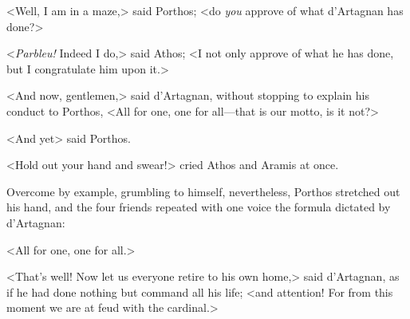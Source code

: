 <Well, I am in a maze,> said Porthos; <do \textit{you} approve of what d'Artagnan has done?> 

<\textit{Parbleu!} Indeed I do,> said Athos; <I not only approve of what he has done, but I congratulate him upon it.> 

<And now, gentlemen,> said d'Artagnan, without stopping to explain his conduct to Porthos, <All for one, one for all---that is our motto, is it not?> 

<And yet\longdash> said Porthos. 

<Hold out your hand and swear!> cried Athos and Aramis at once. 

Overcome by example, grumbling to himself, nevertheless, Porthos stretched out his hand, and the four friends repeated with one voice the formula dictated by d'Artagnan: 

<All for one, one for all.> 

<That's well! Now let us everyone retire to his own home,> said d'Artagnan, as if he had done nothing but command all his life; <and attention! For from this moment we are at feud with the cardinal.> 
